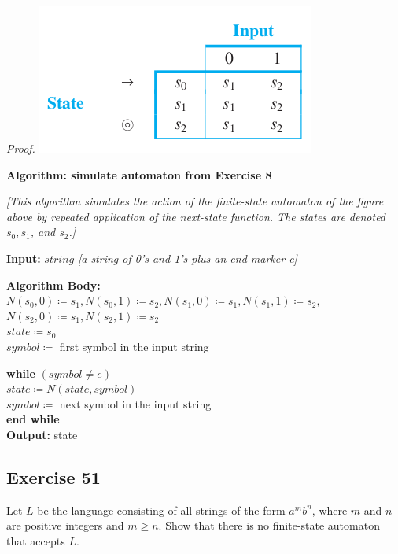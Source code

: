 \documentclass[14pt]{extarticle}
\newcommand{\cy}{\color{cyan}}
\begin{document}
    {\it Proof.}
\includegraphics[scale=0.5]{../images/12.2.8.png}

\begin{tcolorbox}[colframe=cyan]
    {\bf \cy Algorithm: simulate automaton from Exercise 8}

    {\it [This algorithm simulates the action of the finite-state automaton of the figure above by repeated application of the
            next-state function. The states are denoted \(s_0, s_1\), and \(s_2\).]}

    {\bf Input:} \(string\) {\it [a string of 0’s and 1’s plus an end marker e]}

        {\bf Algorithm Body:} \\
    \(N(s_0, 0) \coloneqq s_1, N(s_0, 1) \coloneqq s_2, N(s_1, 0) \coloneqq s_1, N(s_1, 1) \coloneqq s_2,\) \\
    \(N(s_2, 0) \coloneqq s_1, N(s_2, 1) \coloneqq s_2\) \\
    \(state \coloneqq s_0\) \\
    \(symbol \coloneqq\) first symbol in the input string

    \begin{tabbing}
        {\bf while} \= \((symbol \neq e)\) \\
        \> \(state \coloneqq N(state, symbol)\) \\
        \> \(symbol \coloneqq\) next symbol in the input string \\
        {\bf end while} \\
        {\bf Output:} state
    \end{tabbing}
\end{tcolorbox}

\subsection{Exercise 51}
Let \(L\) be the language consisting of all strings of the form \(a^mb^n\), where \(m\) and \(n\) are positive integers
and \(m \geq n\). Show that there is no finite-state automaton that accepts \(L\).
\end{document}
